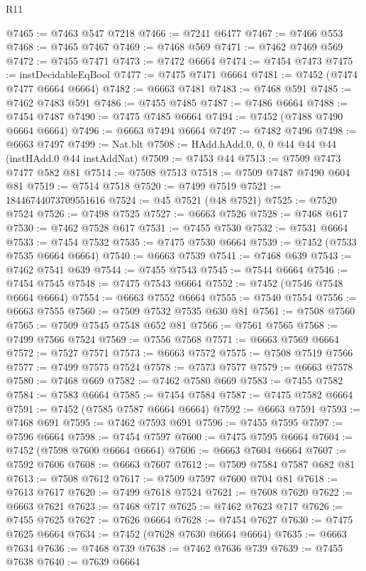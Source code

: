 \begin{lexlean}{R11}
\begin{coremodule}
@7465 := @7463 @547 @7218
@7466 := @7241 @6477
@7467 := @7466 @553
@7468 := @7465 @7467
@7469 := @7468 @569
@7471 := @7462 @7469 @569
@7472 := @7455 @7471
@7473 := @7472 @6664
@7474 := @7454 @7473
@7475 := instDecidableEqBool
@7477 := @7475 @7471 @6664
@7481 := @7452 (@7474 @7477 @6664 @6664)
@7482 := @6663 @7481
@7483 := @7468 @591
@7485 := @7462 @7483 @591
@7486 := @7455 @7485
@7487 := @7486 @6664
@7488 := @7454 @7487
@7490 := @7475 @7485 @6664
@7494 := @7452 (@7488 @7490 @6664 @6664)
@7496 := @6663 @7494 @6664
@7497 := @7482 @7496
@7498 := @6663 @7497
@7499 := Nat.blt
@7508 := HAdd.hAdd.{0, 0, 0} @44 @44 @44 (instHAdd.{0} @44 instAddNat)
@7509 := @7453 @44
@7513 := @7509 @7473 @7477 @582 @81
@7514 := @7508 @7513
@7518 := @7509 @7487 @7490 @604 @81
@7519 := @7514 @7518
@7520 := @7499 @7519
@7521 := 18446744073709551616
@7524 := @45 @7521 (@48 @7521)
@7525 := @7520 @7524
@7526 := @7498 @7525
@7527 := @6663 @7526
@7528 := @7468 @617
@7530 := @7462 @7528 @617
@7531 := @7455 @7530
@7532 := @7531 @6664
@7533 := @7454 @7532
@7535 := @7475 @7530 @6664
@7539 := @7452 (@7533 @7535 @6664 @6664)
@7540 := @6663 @7539
@7541 := @7468 @639
@7543 := @7462 @7541 @639
@7544 := @7455 @7543
@7545 := @7544 @6664
@7546 := @7454 @7545
@7548 := @7475 @7543 @6664
@7552 := @7452 (@7546 @7548 @6664 @6664)
@7554 := @6663 @7552 @6664
@7555 := @7540 @7554
@7556 := @6663 @7555
@7560 := @7509 @7532 @7535 @630 @81
@7561 := @7508 @7560
@7565 := @7509 @7545 @7548 @652 @81
@7566 := @7561 @7565
@7568 := @7499 @7566 @7524
@7569 := @7556 @7568
@7571 := @6663 @7569 @6664
@7572 := @7527 @7571
@7573 := @6663 @7572
@7575 := @7508 @7519 @7566
@7577 := @7499 @7575 @7524
@7578 := @7573 @7577
@7579 := @6663 @7578
@7580 := @7468 @669
@7582 := @7462 @7580 @669
@7583 := @7455 @7582
@7584 := @7583 @6664
@7585 := @7454 @7584
@7587 := @7475 @7582 @6664
@7591 := @7452 (@7585 @7587 @6664 @6664)
@7592 := @6663 @7591
@7593 := @7468 @691
@7595 := @7462 @7593 @691
@7596 := @7455 @7595
@7597 := @7596 @6664
@7598 := @7454 @7597
@7600 := @7475 @7595 @6664
@7604 := @7452 (@7598 @7600 @6664 @6664)
@7606 := @6663 @7604 @6664
@7607 := @7592 @7606
@7608 := @6663 @7607
@7612 := @7509 @7584 @7587 @682 @81
@7613 := @7508 @7612
@7617 := @7509 @7597 @7600 @704 @81
@7618 := @7613 @7617
@7620 := @7499 @7618 @7524
@7621 := @7608 @7620
@7622 := @6663 @7621
@7623 := @7468 @717
@7625 := @7462 @7623 @717
@7626 := @7455 @7625
@7627 := @7626 @6664
@7628 := @7454 @7627
@7630 := @7475 @7625 @6664
@7634 := @7452 (@7628 @7630 @6664 @6664)
@7635 := @6663 @7634
@7636 := @7468 @739
@7638 := @7462 @7636 @739
@7639 := @7455 @7638
@7640 := @7639 @6664

\end{coremodule}
\end{lexlean}
